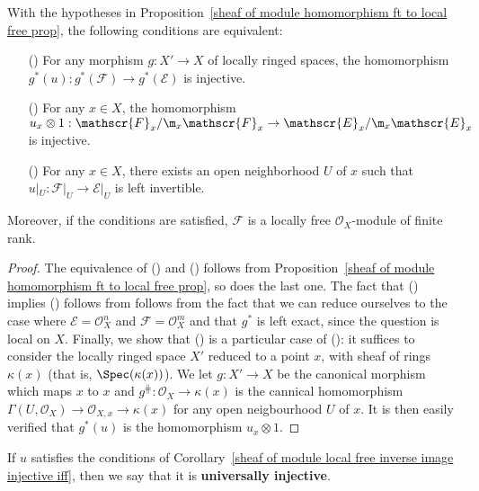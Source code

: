\begin{corollary}\label{sheaf of module local free inverse image injective iff}
With the hypotheses in Proposition~\ref{sheaf of module homomorphism ft to local free prop}, the following conditions are equivalent:
\begin{itemize}
\item[(\rmnum{1})] For any morphism $g:X'\to X$ of locally ringed spaces, the homomorphism $g^*(u):g^*(\mathscr{F})\to g^*(\mathscr{E})$ is injective.
\item[(\rmnum{2})] For any $x\in X$, the homomorphism $u_x\otimes 1:\mathscr{F}_x/\m_x\mathscr{F}_x\to\mathscr{E}_x/\m_x\mathscr{E}_x$ is injective.
\item[(\rmnum{3})] For any $x\in X$, there exists an open neighborhood $U$ of $x$ such that $u|_U:\mathscr{F}|_U\to\mathscr{E}|_U$ is left invertible.
\end{itemize}
Moreover, if the conditions are satisfied, $\mathscr{F}$ is a locally free $\mathscr{O}_X$-module of finite rank.
\end{corollary}
\begin{proof}
The equivalence of () and () follows from Proposition~\ref{sheaf of module homomorphism ft to local free prop}, so does the last one. The fact that () implies () follows from follows from the fact that we can reduce ourselves to the case where $\mathscr{E}=\mathscr{O}_X^n$ and $\mathscr{F}=\mathscr{O}_X^m$ and that $g^*$ is left exact, since the question is local on $X$. Finally, we show that () is a particular case of (): it suffices to consider the locally ringed space $X'$ reduced to a point $x$, with sheaf of rings $\kappa(x)$ (that is, $\Spec(\kappa(x))$). We let $g:X'\to X$ be the canonical morphism which maps $x$ to $x$ and $g^{\hash}:\mathscr{O}_X\to\kappa(x)$ is the cannical homomorphism $\Gamma(U,\mathscr{O}_X)\to\mathscr{O}_{X,x}\to\kappa(x)$ for any open neigbourhood $U$ of $x$. It is then easily verified that $g^*(u)$ is the homomorphism $u_x\otimes 1$. 
\end{proof}
\begin{remark}
If $u$ satisfies the conditions of Corollary~\ref{sheaf of module local free inverse image injective iff}, then we say that it is \textbf{universally injective}.
\end{remark}
